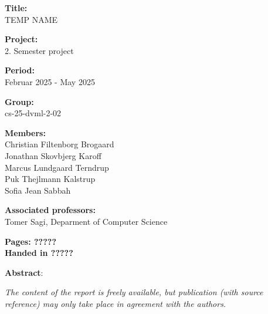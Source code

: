 \begin{minipage}[t]{0.48\textwidth}
\textbf{Title:} \\[5pt]\hspace*{2ex}
TEMP NAME

\vspace*{2ex}

\textbf{Project:} \\[5pt]\bigskip\hspace{2ex}
2. Semester project

\textbf{Period:} \\[5pt]\bigskip\hspace{2ex}
Februar 2025 -  May 2025

\textbf{Group:} \\[5pt]\bigskip\hspace{2ex}
cs-25-dvml-2-02

\textbf{Members:} \\[5pt]\hspace*{2ex}
Christian Filtenborg Brogaard \\\hspace*{2ex}
Jonathan Skovbjerg Karoff \\\hspace*{2ex}
Marcus Lundgaard Terndrup \\\hspace*{2ex}
Puk Thejlmann Kalstrup \\\hspace*{2ex}
Sofia Jean Sabbah \\\hspace*{2ex}


\textbf{Associated professors:} \\[5pt]\hspace*{2ex}
Tomer Sagi, Deparment of Computer Science
\\\hspace*{2ex}

\vspace*{1cm}

\textbf{Pages: ?????} \\
\textbf{Handed in ?????}

\end{minipage}
\hfill
\begin{minipage}[t]{0.5\textwidth}
\textbf{Abstract}: \\[5pt]
\fbox{\parbox{8cm}{}}
\end{minipage}

\vfill

{\footnotesize\itshape \noindent The content of the report is freely available, but publication (with source reference) may only take place in agreement with the authors.}

